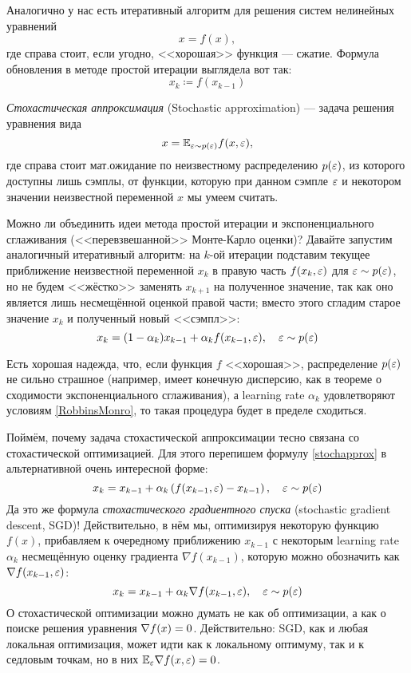 Аналогично у нас есть итеративный алгоритм для решения систем нелинейных уравнений
$$x = f(x),$$
где справа стоит, если угодно, <<хорошая>> функция --- сжатие. Формула обновления в методе простой итерации выглядела вот так:
$$x_k \coloneqq f(x_{k-1})$$

\begin{definition}
\emph{Стохастическая аппроксимация} (Stochastic approximation) --- задача решения уравнения вида
\begin{equation}\label{stochapproxeq}
x = \mathbb{E}_{\varepsilon \sim p(\varepsilon)} f(x, \varepsilon),
\end{equation}
где справа стоит мат.ожидание по неизвестному распределению $p(\varepsilon)$, из которого доступны лишь сэмплы, от функции, которую при данном сэмпле $\varepsilon$ и некотором значении неизвестной переменной $x$ мы умеем считать. 
\end{definition}

Можно ли объединить идеи метода простой итерации и экспоненциального сглаживания (<<перевзвешанной>> Монте-Карло оценки)? Давайте запустим аналогичный итеративный алгоритм: на $k$-ой итерации подставим текущее приближение неизвестной переменной $x_k$ в правую часть $f(x_k, \varepsilon)$ для $\eps \HM\sim p(\eps)$, но не будем <<жёстко>> заменять $x_{k+1}$ на полученное значение, так как оно является лишь несмещённой оценкой правой части; вместо этого сгладим старое значение $x_k$ и полученный новый <<сэмпл>>:
\begin{equation}\label{stochapprox}
x_k = (1 - \alpha_k)x_{k-1} + \alpha_k f(x_{k-1}, \varepsilon), \quad \varepsilon \sim p(\varepsilon)
\end{equation}

Есть хорошая надежда, что, если функция $f$ <<хорошая>>, распределение $p(\varepsilon)$ не сильно страшное (например, имеет конечную дисперсию, как в теореме о сходимости экспоненциального сглаживания), а learning rate $\alpha_k$ удовлетворяют условиям \eqref{RobbinsMonro}, то такая процедура будет в пределе сходиться.

Поймём, почему задача стохастической аппроксимации тесно связана со стохастической оптимизацией. Для этого перепишем формулу \eqref{stochapprox} в альтернативной очень интересной форме:
\begin{equation}\label{stochapproxgrad}
x_k = x_{k-1} + \alpha_k \left( f(x_{k-1}, \varepsilon) - x_{k-1} \right), \quad \varepsilon \sim p(\varepsilon)
\end{equation}
Да это же формула \emph{стохастического градиентного спуска} (stochastic gradient descent, SGD)! Действительно, в нём мы, оптимизируя некоторую функцию $f(x)$, прибавляем к очередному приближению $x_{k-1}$ с некоторым learning rate $\alpha_k$ несмещённую оценку градиента $\nabla f(x_{k-1})$, которую можно обозначить как $\nabla f(x_{k-1}, \varepsilon)$:
$$x_k = x_{k-1} + \alpha_k \nabla f(x_{k-1}, \varepsilon), \quad \varepsilon \sim p(\varepsilon)$$
О стохастической оптимизации можно думать не как об оптимизации, а как о поиске решения уравнения $\nabla f(x) \HM= 0$. Действительно: SGD, как и любая локальная оптимизация, может идти как к локальному оптимуму, так и к седловым точкам, но в них $\E_{\eps} \nabla f(x, \eps) \HM= 0$.

